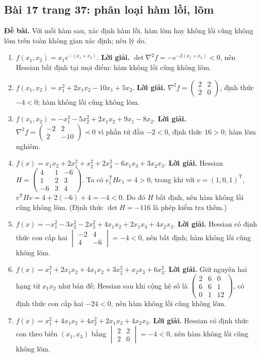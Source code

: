 \documentclass[11pt,a4paper]{article}
\newcommand{\Hess}{\nabla^2}
\begin{document}
\subsection{Bài 17 trang 37: phân loại hàm lồi, lõm}
\textbf{Đề bài.} Với mỗi hàm sau, xác định hàm lồi, hàm lõm hay không lồi cũng không lõm trên toàn không gian xác định; nêu lý do.
\begin{enumerate}
\item \(f(x_1,x_2)=x_1e^{-(x_1+x_2)}\). \textbf{Lời giải.} \(\det\Hess f=-e^{-2(x_1+x_2)}<0\), nên Hessian bất định tại mọi điểm: hàm không lồi cũng không lõm.
\item \(f(x_1,x_2)=x_1^2+2x_1x_2-10x_1+5x_2\). \textbf{Lời giải.} \(\Hess f=\begin{pmatrix}2&2\\2&0\end{pmatrix}\), định thức \(-4<0\); hàm không lồi cũng không lõm.
\item \(f(x_1,x_2)=-x_1^2-5x_2^2+2x_1x_2+9x_1-8x_2\). \textbf{Lời giải.} \(\Hess f=\begin{pmatrix}-2&2\\2&-10\end{pmatrix}\prec0\) vì phần tử đầu \(-2<0\), định thức \(16>0\); hàm lõm nghiêm.
\item \(f(x)=x_1x_2+2x_1^2+x_2^2+2x_3^2-6x_1x_3+3x_2x_3\). \textbf{Lời giải.} Hessian \(H=\begin{pmatrix}4&1&-6\\1&2&3\\-6&3&4\end{pmatrix}\). Ta có \(e_1^{\mathsf T}H e_1=4>0\), trong khi với \(v=(1,0,1)^\mathsf T\), \(v^{\mathsf T}H v=4+2(-6)+4=-4<0\). Do đó \(H\) bất định, nên hàm không lồi cũng không lõm. (Định thức \(\det H=-116\) là phép kiểm tra thêm.)
\item \(f(x)=-x_1^2-3x_2^2-2x_3^2+4x_1x_2+2x_1x_3+4x_2x_3\). \textbf{Lời giải.} Hessian có định thức con cấp hai \(\begin{vmatrix}-2&4\\4&-6\end{vmatrix}=-4<0\), nên bất định; hàm không lồi cũng không lõm.
\item \(f(x)=x_1^2+2x_1x_2+4x_1x_2+3x_2^2+x_2x_3+6x_3^2\). \textbf{Lời giải.} Giữ nguyên hai hạng tử \(x_1x_2\) như bản đề; Hessian sau khi cộng hệ số là \(\begin{pmatrix}2&6&0\\6&6&1\\0&1&12\end{pmatrix}\), có định thức con cấp hai \(-24<0\), nên hàm không lồi cũng không lõm.
\item \(f(x)=x_1^2+4x_1x_2+4x_2^2+2x_1x_3+4x_2x_3\). \textbf{Lời giải.} Hessian có định thức con theo biến \((x_1,x_3)\) bằng \(\begin{vmatrix}2&2\\2&0\end{vmatrix}=-4<0\), nên hàm không lồi cũng không lõm.
\end{enumerate}
\end{document}
